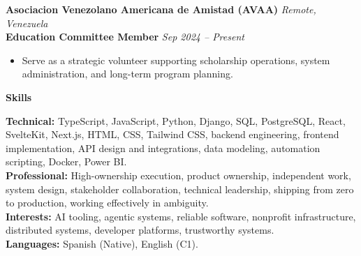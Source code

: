 \documentclass[11pt]{article}
\begin{document}
\textbf{Asociacion Venezolano Americana de Amistad (AVAA)} \hfill \textit{Remote, Venezuela} \\
\textbf{Education Committee Member} \hfill \textit{Sep 2024 -- Present}
\begin{itemize}
    \item Serve as a strategic volunteer supporting scholarship operations, system administration, and long-term program planning.
\end{itemize}
\vspace{8pt}
\begin{center}
    \textbf{Skills}
\end{center}
\vspace{-4pt}
\textbf{Technical:} TypeScript, JavaScript, Python, Django, SQL, PostgreSQL, React, SvelteKit, Next.js, HTML, CSS, Tailwind CSS, backend engineering, frontend implementation, API design and integrations, data modeling, automation scripting, Docker, Power BI.
\\[4pt]
\textbf{Professional:} High-ownership execution, product ownership, independent work, system design, stakeholder collaboration, technical leadership, shipping from zero to production, working effectively in ambiguity.
\\[4pt]
\textbf{Interests:} AI tooling, agentic systems, reliable software, nonprofit infrastructure, distributed systems, developer platforms, trustworthy systems.
\\[4pt]
\textbf{Languages:} Spanish (Native), English (C1).
\end{document}
